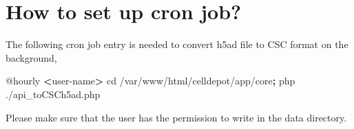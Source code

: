 \documentclass[
]{book}
\newenvironment{Shaded}{\begin{snugshade}}{\end{snugshade}}
\newcommand{\ExtensionTok}[1]{#1}
\newcommand{\KeywordTok}[1]{\textcolor[rgb]{0.13,0.29,0.53}{\textbf{#1}}}
\newcommand{\NormalTok}[1]{#1}
\newcommand{\OperatorTok}[1]{\textcolor[rgb]{0.81,0.36,0.00}{\textbf{#1}}}
\begin{document}
\hypertarget{how-to-set-up-cron-job}{%
\section{How to set up cron job?}\label{how-to-set-up-cron-job}}

The following cron job entry is needed to convert h5ad file to CSC format on the background,

\begin{Shaded}
\begin{Highlighting}[]
\ExtensionTok{@hourly} \OperatorTok{\textless{}}\NormalTok{user{-}name}\OperatorTok{\textgreater{}}\NormalTok{ cd /var/www/html/celldepot/app/core}\KeywordTok{;} \ExtensionTok{php}\NormalTok{ ./api\_toCSCh5ad.php}
\end{Highlighting}
\end{Shaded}

Please make sure that the user has the permission to write in the data directory.

  
\end{document}
